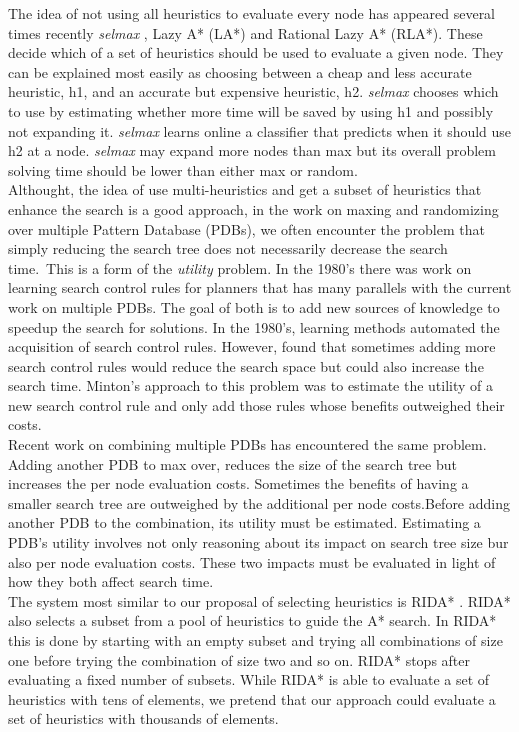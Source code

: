 \documentclass[a4paper,12pt]{article}
\begin{document}
The idea of not using all heuristics to evaluate every node has appeared several times recently \textit{selmax} \citet{domshlak2011selmax}, Lazy A* (LA*) and Rational Lazy A* (RLA*). These decide which of a set of heuristics should be used to evaluate a given node. They can be explained most easily as choosing between a cheap and less accurate heuristic, h1, and an accurate but expensive heuristic, h2. \textit{selmax} chooses which to use by estimating whether more time will be saved by using h1 and possibly not expanding it. \textit{selmax} learns online a classifier that predicts when it should use h2 at a node. \textit{selmax} may expand more nodes than max but its overall problem solving time should be lower than either max or random.\\

Althought, the idea of use multi-heuristics and get a subset of heuristics that enhance the search is a good approach, in the work on maxing and randomizing over multiple Pattern Database (PDBs), we often encounter the problem that simply reducing the search tree does not necessarily decrease the search time.\
This is a form of the \textit{utility} problem. In the 1980's there was work on learning search control rules for planners that has many parallels with the current work on multiple PDBs. The goal of both is to add new sources of knowledge to speedup the search for solutions. In the 1980's, learning methods automated the acquisition of search control rules. However, \citep{Minton1990363} found that sometimes adding more search control rules would reduce the search space but could also increase the search time. Minton's approach to this problem was to estimate the utility of a new search control rule and only add those rules whose benefits outweighed their costs.\\

Recent work on combining multiple PDBs has encountered the same problem. Adding another PDB to max over, reduces the size of the search tree but increases the per node evaluation costs. Sometimes the benefits of having a smaller search tree are outweighed by the additional per node costs.Before adding another PDB to the combination, its utility must be estimated. Estimating a PDB's utility involves not only reasoning about its impact on search tree size bur also per node evaluation costs. These two impacts must be evaluated in light of how they both affect search time.\\

The system most similar to our proposal of selecting heuristics is RIDA* \citep{BarleySantiagoOver}. RIDA* also selects a subset from a pool of heuristics to guide the A* search. In RIDA* this is done by starting with an empty subset and trying all combinations of size one before trying the combination of size two and so on. RIDA* stops after evaluating a fixed number of subsets. While RIDA* is able to evaluate a set of heuristics with tens of elements, we pretend that our approach could evaluate a set of heuristics with thousands of elements.\\
\end{document}
